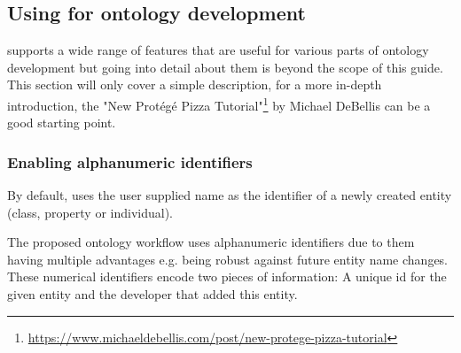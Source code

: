 \subsection{Using {\protege} for ontology development}
\label{ssec:using-protege}

{\protege} supports a wide range of features that are useful for various parts of ontology development but going into detail about them is beyond the scope of this guide. This section will only cover a simple description, for a more in-depth introduction, the "New Prot{\'e}g{\'e} Pizza Tutorial"\footnote{\url{https://www.michaeldebellis.com/post/new-protege-pizza-tutorial}} by Michael DeBellis can be a good starting point.


\subsubsection{Enabling alphanumeric identifiers}
By default, {\protege} uses the user supplied name as the identifier of a newly created entity (class, property or individual).

The proposed ontology workflow uses alphanumeric identifiers due to them having multiple advantages e.g. being robust against future entity name changes. These numerical identifiers encode two pieces of information: A unique id for the given entity and the developer that added this entity.



